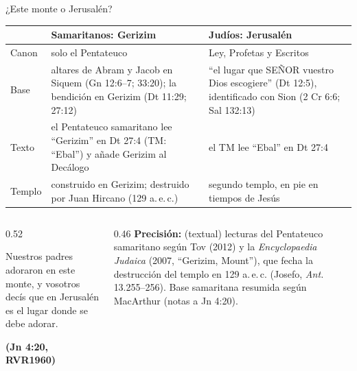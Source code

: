 \documentclass[hyperref={bookmarks=false},aspectratio=169]{beamer}
\newcommand{\SENOR}{S{\fontsize{0.78em}{1em}\selectfont EÑOR}}
\newcommand{\fuente}[1]{\par\hfill{\upshape\bfseries\footnotesize\textcolor{azul}{#1}}}
\newcommand{\precision}[1]{{\footnotesize\color{gris}\textbf{Precisión:} #1}}
\begin{document}
\begin{frame}{¿Este monte o Jerusalén?}
\scriptsize\renewcommand{\arraystretch}{1.18}
\begin{tabular}{@{}>{\RaggedRight\arraybackslash}p{2.6cm}>{\RaggedRight\arraybackslash}p{4.6cm}>{\RaggedRight\arraybackslash}p{4.6cm}@{}}
\toprule
 & \textbf{Samaritanos: Gerizim} & \textbf{Judíos: Jerusalén} \\ \midrule
Canon & solo el Pentateuco & Ley, Profetas y Escritos \\
Base & altares de Abram y Jacob en Siquem (Gn 12:6--7; 33:20); la bendición en Gerizim (Dt 11:29; 27:12) & ``el lugar que \SENOR{} vuestro Dios escogiere'' (Dt 12:5), identificado con Sion (2 Cr 6:6; Sal 132:13) \\
Texto & el Pentateuco samaritano lee ``Gerizim'' en Dt 27:4 (TM: ``Ebal'') y añade Gerizim al Decálogo & el TM lee ``Ebal'' en Dt 27:4 \\
Templo & construido en Gerizim; destruido por Juan Hircano (129 a.\,e.\,c.) & segundo templo, en pie en tiempos de Jesús \\
\bottomrule
\end{tabular}\par\medskip
\begin{columns}[t,onlytextwidth]
\begin{column}{0.52\textwidth}
\begin{cita}Nuestros padres adoraron en este monte, y vosotros decís que en Jerusalén es el lugar donde se debe adorar.\fuente{(Jn 4:20, RVR1960)}\end{cita}
\end{column}
\begin{column}{0.46\textwidth}
\precision{(textual) lecturas del Pentateuco samaritano según Tov (2012) y la \emph{Encyclopaedia Judaica} (2007, ``Gerizim, Mount''), que fecha la destrucción del templo en 129 a.\,e.\,c. (Josefo, \emph{Ant.} 13.255--256). Base samaritana resumida según MacArthur (notas a Jn 4:20).}
\end{column}
\end{columns}
\end{frame}
\end{document}
